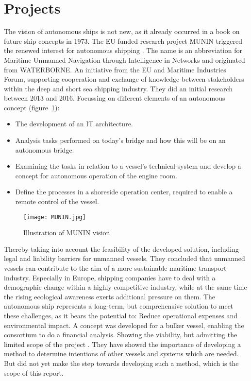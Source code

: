 \section{Projects}
The vision of autonomous ships is not new, as it already occurred in a book on future ship concepts in 1973. The EU-funded research project MUNIN triggered the renewed interest for autonomous shipping \cite{Saarni2018}. The name is an abbreviation for Maritime Unmanned Navigation through Intelligence in Networks and originated from WATERBORNE. An initiative from the EU and Maritime Industries Forum, supporting cooperation and exchange of knowledge between stakeholders within the deep and short sea shipping industry. They did an initial research between 2013 and 2016. Focussing on different elements of an autonomous concept (figure~\ref{fig:MUNIN}): 
\begin{itemize}
	\item The development of an IT architecture. 
	\item Analysis tasks performed on today's bridge and how this will be on an autonomous bridge. 
	\item Examining the tasks in relation to a vessel’s technical system and develop a concept for autonomous operation of the engine room. 
	\item Define the processes in a shoreside operation center, required to enable a remote control of the vessel. 
\end{itemize}

\begin{figure}[hbp]
	\centering
	\texttt{[image: MUNIN.jpg]}
	\caption{Illustration of MUNIN vision}
	\label{fig:MUNIN}
\end{figure}

Thereby taking into account the feasibility of the developed solution, including legal and liability barriers for unmanned vessels.
They concluded that unmanned vessels can contribute to the aim of a more sustainable maritime transport industry. Especially in Europe, shipping companies have to deal with a demographic change within a highly competitive industry, while at the same time the rising ecological awareness exerts additional pressure on them. The autonomous ship represents a long-term, but comprehensive solution to meet these challenges, as it bears the potential to: Reduce operational expenses and environmental impact.
A concept was developed for a bulker vessel, enabling the consortium to do a financial analysis. Showing the viability, but admitting the limited scope of the project \cite{MUNIN2016}. They have showed the importance of developing a method to determine intentions of other vessels and systems which are needed. But did not yet make the step towards developing such a method, which is the scope of this report.

